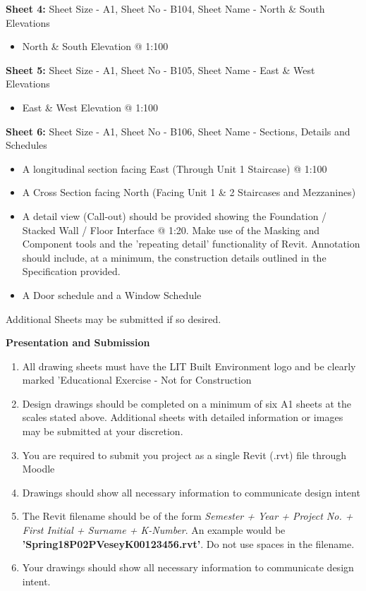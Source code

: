 \textbf{Sheet 4:} Sheet Size - A1, Sheet No - B104, Sheet Name - North \& South Elevations
\begin{itemize}
	\item North \& South Elevation @ 1:100
\end{itemize}

\textbf{Sheet 5:} Sheet Size - A1, Sheet No - B105, Sheet Name - East \& West Elevations
\begin{itemize}
	\item East \& West Elevation @ 1:100
\end{itemize}




\textbf{Sheet 6:} Sheet Size - A1, Sheet No - B106, Sheet Name - Sections, Details and Schedules
\begin{itemize}
	\item A longitudinal section facing East (Through Unit 1 Staircase) @ 1:100
	\item A Cross Section facing North (Facing Unit 1 \& 2 Staircases and Mezzanines)
	\item A detail view (Call-out) should be provided showing the Foundation / Stacked Wall / Floor Interface @ 1:20.  Make use of the Masking and Component tools and the 'repeating detail' functionality of Revit.  Annotation should include, at a minimum, the construction details outlined in the Specification provided.
	\item A Door schedule and a Window Schedule
\end{itemize}

Additional Sheets may be submitted if so desired.

\large\textbf{Presentation and Submission}\\
\begin{enumerate}
	\item All drawing sheets must have the LIT Built Environment logo and be clearly marked 'Educational Exercise - Not for Construction
	\item Design drawings should be completed on a minimum of six A1 sheets at the scales stated above.  Additional sheets with detailed information or images may be submitted at your discretion.
	\item You are required to submit you project as a single Revit (.rvt) file through Moodle
	\item Drawings should show all necessary information to communicate design intent
	\item The Revit filename should be of the form \textit{Semester  + Year + Project No. + First Initial + Surname + K-Number}. An example would be \textbf{'Spring18P02PVeseyK00123456.rvt'}.  Do not use spaces in the filename.
	\item Your drawings should show all necessary information to communicate design intent. 
\end{enumerate}











